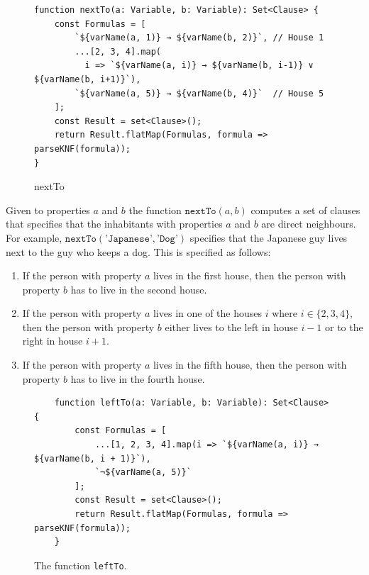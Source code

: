 \begin{figure}[!ht]
\centering
\begin{verbatim}
function nextTo(a: Variable, b: Variable): Set<Clause> {
    const Formulas = [
        `${varName(a, 1)} → ${varName(b, 2)}`, // House 1
        ...[2, 3, 4].map(
          i => `${varName(a, i)} → ${varName(b, i-1)} ∨ ${varName(b, i+1)}`), 
        `${varName(a, 5)} → ${varName(b, 4)}`  // House 5
    ];
    const Result = set<Clause>();
    return Result.flatMap(Formulas, formula => parseKNF(formula));
}
\end{verbatim}
\vspace*{-0.3cm}
\caption{nextTo} %
\label{fig:nextTo}
\end{figure}
Given to properties $a$ and $b$ the function $\texttt{nextTo}(a, b)$ computes a
set of clauses that specifies that the inhabitants with properties $a$ and $b$
are direct neighbours.  For example, $\texttt{nextTo}(\texttt{'Japanese'}, \texttt{'Dog'})$
specifies that the Japanese guy lives next to the guy who keeps a dog. 
This is specified as follows:
\begin{enumerate}
\item If the person with property $a$ lives in the first house, then the person with property $b$ has to live
      in the second house.
\item If the person with property $a$ lives in one of the houses $i$ where $i \in \{ 2, 3, 4 \}$, then
      the person with property $b$ either lives to the left in house $i-1$ or to the right in house $i+1$.
\item If the person with property $a$ lives in the fifth house, then the person with property $b$ has to live
      in the fourth house.
\end{enumerate}

\begin{figure}[!ht]
\centering
\begin{verbatim}
    function leftTo(a: Variable, b: Variable): Set<Clause> {
        const Formulas = [
            ...[1, 2, 3, 4].map(i => `${varName(a, i)} → ${varName(b, i + 1)}`),
            `¬${varName(a, 5)}`
        ];
        const Result = set<Clause>();
        return Result.flatMap(Formulas, formula => parseKNF(formula));
    }
\end{verbatim}
\vspace*{-0.3cm}
\caption{The function \texttt{leftTo}.} %
\label{fig:leftTo}
\end{figure}

